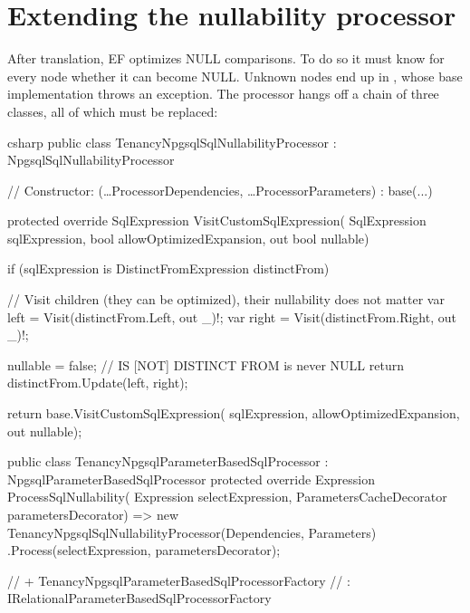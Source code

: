 \section{Extending the nullability processor}

After translation, EF optimizes NULL comparisons. To do so it must know for every node
whether it can become NULL. Unknown nodes end up in
, whose base
implementation throws an exception. The processor hangs off a chain of three classes, all of
which must be replaced:

\begin{sourcecode}{csharp}
public class TenancyNpgsqlSqlNullabilityProcessor : NpgsqlSqlNullabilityProcessor
{
    // Constructor: (…ProcessorDependencies, …ProcessorParameters) : base(...)

    protected override SqlExpression VisitCustomSqlExpression(
        SqlExpression sqlExpression, bool allowOptimizedExpansion, out bool nullable)
    {
        if (sqlExpression is DistinctFromExpression distinctFrom)
        {
            // Visit children (they can be optimized), their nullability does not matter
            var left = Visit(distinctFrom.Left, out _)!;
            var right = Visit(distinctFrom.Right, out _)!;

            nullable = false;                   // IS [NOT] DISTINCT FROM is never NULL
            return distinctFrom.Update(left, right);
        }

        return base.VisitCustomSqlExpression(
            sqlExpression, allowOptimizedExpansion, out nullable);
    }
}

public class TenancyNpgsqlParameterBasedSqlProcessor : NpgsqlParameterBasedSqlProcessor
{
    protected override Expression ProcessSqlNullability(
        Expression selectExpression, ParametersCacheDecorator parametersDecorator)
        => new TenancyNpgsqlSqlNullabilityProcessor(Dependencies, Parameters)
            .Process(selectExpression, parametersDecorator);
}

// + TenancyNpgsqlParameterBasedSqlProcessorFactory
//   : IRelationalParameterBasedSqlProcessorFactory
\end{sourcecode}

